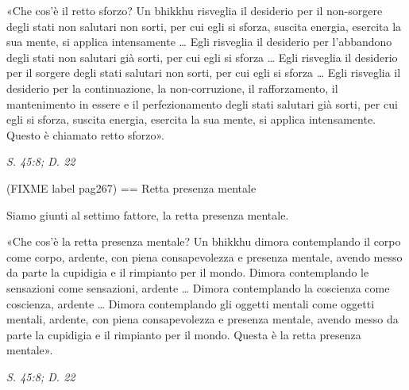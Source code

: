  «Che cos’è il retto sforzo? Un bhikkhu risveglia il
desiderio per il non-sorgere degli stati non salutari non sorti, per cui
egli si sforza, suscita energia, esercita la sua mente, si applica
intensamente … Egli risveglia il desiderio per l’abbandono degli stati
non salutari già sorti, per cui egli si sforza … Egli risveglia il
desiderio per il sorgere degli stati salutari non sorti, per cui egli si
sforza … Egli risveglia il desiderio per la continuazione, la
non-corruzione, il rafforzamento, il mantenimento in essere e il
perfezionamento degli stati salutari già sorti, per cui egli si sforza,
suscita energia, esercita la sua mente, si applica intensamente. Questo
è chiamato retto sforzo».


\emph{S. 45:8; D. 22}


(FIXME label pag267)
== Retta presenza mentale


 Siamo giunti al settimo fattore, la retta presenza
mentale.


 «Che cos’è la retta presenza mentale? Un bhikkhu dimora
contemplando il corpo come corpo, ardente, con piena consapevolezza e
presenza mentale, avendo messo da parte la cupidigia e il rimpianto per
il mondo. Dimora contemplando le sensazioni come sensazioni, ardente …
Dimora contemplando la coscienza come coscienza, ardente … Dimora
contemplando gli oggetti mentali come oggetti mentali, ardente, con
piena consapevolezza e presenza mentale, avendo messo da parte la
cupidigia e il rimpianto per il mondo. Questa è la retta presenza
mentale».


\emph{S. 45:8; D. 22}


